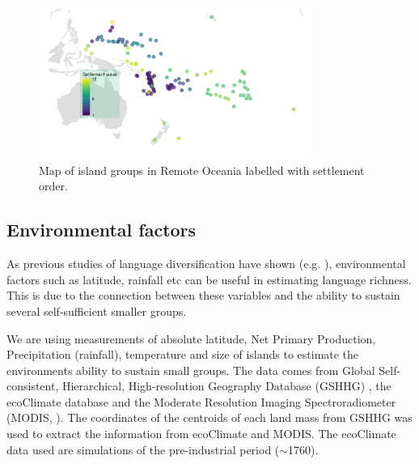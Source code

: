 \documentclass[12pt,letterpaper]{article}
\begin{document}
\begin{figure}
\centering
\includegraphics[width=0.8\textwidth]{Map_RO_dates}
\caption{{Map of island groups in Remote Oceania labelled with settlement order.}}
\label{appendix_dates_map}
\end{figure}

\FloatBarrier
\subsection{Environmental factors} 
\label{appendix_environ}
As previous studies of language diversification have shown (e.g. \citet{ greenhill2015demographic, gavin2017process, Pacheco_Coelho_2019, hua2019ecological}), environmental factors such as latitude, rainfall etc can be useful in estimating language richness. This is due to the connection between these variables and the ability to sustain several self-sufficient smaller groups.


We are using measurements of absolute latitude, Net Primary Production, Precipitation (rainfall), temperature and size of islands to estimate the environments ability to sustain small groups. The data comes from Global Self-consistent, Hierarchical, High-resolution Geography Database (GSHHG) \citep{wessel1996global}, the ecoClimate database \citep{ecoclimate} and the Moderate Resolution Imaging Spectroradiometer (MODIS, \citet{running2021modis_terra, running2021modis_aqua}). The coordinates of the centroids of each land mass from GSHHG was used to extract the information from ecoClimate and MODIS. The ecoClimate data used are simulations of the pre-industrial period ($\sim$1760).
\end{document}
